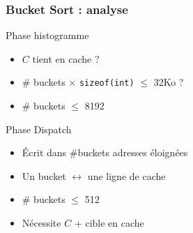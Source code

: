 \documentclass[xcolor={x11names,svgnames}]{beamer}
\newcommand{\red}[1]{{\color{red}#1}}
\begin{document}

\begin{frame}[fragile]
  \frametitle{Bucket Sort : analyse}


  \begin{exampleblock}{Phase \og histogramme\fg{}}
    \begin{itemize}
    \item $C$ tient en cache ? 
    \item \# buckets $\times$ \texttt{sizeof(int)} $\leq$ 32Ko ?
    \item \# buckets $\leq$ 8192 
    \end{itemize}
  \end{exampleblock}

  \medskip

  \begin{alertblock}{Phase \og Dispatch\fg{}}
    \begin{itemize}
    \item Écrit dans \#buckets adresses \red{éloignées}
    \item Un bucket $\leftrightarrow$ une ligne de cache
    \item \# buckets $\leq$ 512 
    \item \scriptsize Nécessite $C$ + cible en cache
    \end{itemize}
  \end{alertblock}  
\end{frame}

\end{document}
